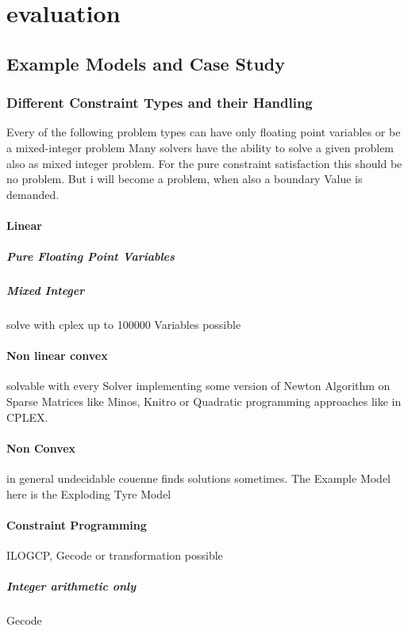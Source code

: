 \chapter{evaluation}
\section{Example Models and Case Study}
\subsection{Different Constraint Types and their Handling}
Every of the following problem types can have only floating point variables or be a mixed-integer problem
Many solvers have the ability to solve a given problem also as mixed integer problem. For the pure constraint satisfaction this should be no problem. But i will become a problem, when also a boundary Value is demanded.
\subsubsection{Linear}
\paragraph{Pure Floating Point Variables}
\paragraph{Mixed Integer}
solve with cplex up to 100000 Variables possible
\subsubsection{Non linear convex}
solvable with every Solver implementing some version of Newton Algorithm on Sparse Matrices like Minos, Knitro or Quadratic programming approaches like in CPLEX.
\subsubsection{Non Convex}
in general undecidable couenne finds solutions sometimes.
The Example Model here is the Exploding Tyre Model
\subsubsection{Constraint Programming}
ILOGCP, Gecode or transformation possible
\paragraph{Integer arithmetic only} Gecode
